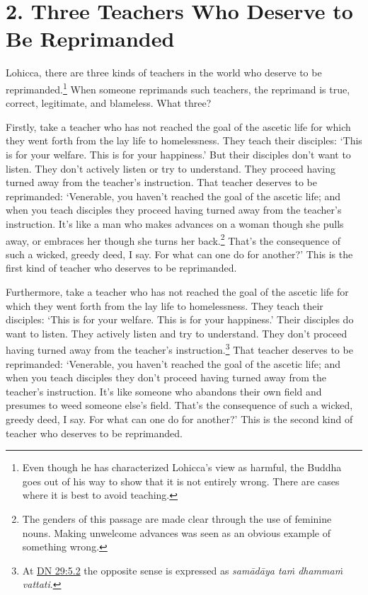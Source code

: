 \documentclass[12pt,openany]{book}%
\begin{document}
\section*{2. Three Teachers Who Deserve to Be Reprimanded }

Lohicca, there are three kinds of teachers in the world who deserve to be reprimanded.\footnote{Even though he has characterized Lohicca’s view as harmful, the Buddha goes out of his way to show that it is not entirely wrong. There are cases where it is best to avoid teaching. } When someone reprimands such teachers, the reprimand is true, correct, legitimate, and blameless. What three? 

Firstly, take a teacher who has not reached the goal of the ascetic life for which they went forth from the lay life to homelessness. They teach their disciples: ‘This is for your welfare. This is for your happiness.’ But their disciples don’t want to listen. They don’t actively listen or try to understand. They proceed having turned away from the teacher’s instruction. That teacher deserves to be reprimanded: ‘Venerable, you haven’t reached the goal of the ascetic life; and when you teach disciples they proceed having turned away from the teacher’s instruction. It’s like a man who makes advances on a woman though she pulls away, or embraces her though she turns her back.\footnote{The genders of this passage are made clear through the use of feminine nouns. Making unwelcome advances was seen as an obvious example of something wrong. } That’s the consequence of such a wicked, greedy deed, I say. For what can one do for another?’ This is the first kind of teacher who deserves to be reprimanded. 

Furthermore, take a teacher who has not reached the goal of the ascetic life for which they went forth from the lay life to homelessness. They teach their disciples: ‘This is for your welfare. This is for your happiness.’ Their disciples do want to listen. They actively listen and try to understand. They don’t proceed having turned away from the teacher’s instruction.\footnote{At \href{https://suttacentral.net/dn29/en/sujato\#5.2}{DN 29:5.2} the opposite sense is expressed as \textit{\textsanskrit{samādāya} \textsanskrit{taṁ} \textsanskrit{dhammaṁ} vattati}. } That teacher deserves to be reprimanded: ‘Venerable, you haven’t reached the goal of the ascetic life; and when you teach disciples they don’t proceed having turned away from the teacher’s instruction. It’s like someone who abandons their own field and presumes to weed someone else’s field. That’s the consequence of such a wicked, greedy deed, I say. For what can one do for another?’ This is the second kind of teacher who deserves to be reprimanded. 
\end{document}

